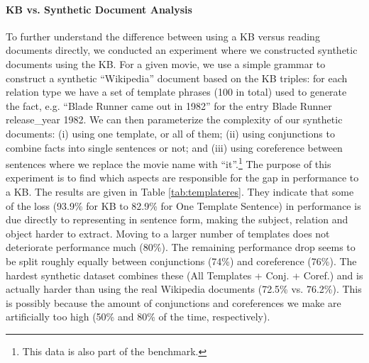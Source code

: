 \paragraph{KB vs. Synthetic Document Analysis}
To further understand the difference between using a KB versus reading documents directly,
we conducted an experiment where we constructed synthetic documents using the KB.
For a given movie, we use a simple grammar to construct a synthetic ``Wikipedia'' document
based on the KB triples: for each relation type we have a set of template phrases
(100 in total)  used to generate the fact, e.g.
``Blade Runner came out in 1982'' for the entry {\sc Blade Runner release\_year 1982}.
We can then parameterize the complexity of our synthetic documents:
(i) using one template, or all of them;
(ii) using conjunctions to combine facts into single sentences or not;
and (iii) using coreference between sentences where we replace the movie name with ``it''.\footnote{This data is also part of the \WikiMovies benchmark.}
The purpose of this experiment is to find which aspects are responsible for the gap
in performance to a KB.
The results are given in Table \ref{tab:templateres}.
They indicate that some of the loss (93.9\% for KB to 82.9\% for One Template Sentence)
 in performance is due directly to representing in sentence form, making the subject, relation
and object harder to extract.
Moving to a larger number of templates does not deteriorate performance much (80\%).
 The remaining performance drop seems to be split roughly
equally between conjunctions (74\%) and coreference (76\%).
The hardest synthetic dataset combines these (All Templates + Conj. + Coref.) and
is actually harder than using the real Wikipedia documents (72.5\% vs. 76.2\%).
This is possibly because the amount of conjunctions and coreferences we make are artificially
too high (50\% and 80\% of the time, respectively).


